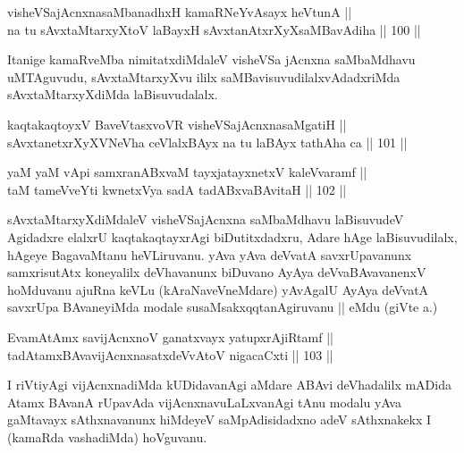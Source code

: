 \begin{shl}
visheVSajAcnxnasaMbanadhxH kamaRNeYvAsayx heVtunA || \\
na tu sAvxtaMtarxyXtoV laBayxH sAvxtanAtxrXyXsaMBavAdiha \hfill || 100 ||  
\end{shl}

\begin{artha}
Itanige kamaRveMba nimitatxdiMdaleV visheVSa jAcnxna saMbaMdhavu
uMTAguvudu, sAvxtaMtarxyXvu ililx saMBavisuvudilalxvAdadxriMda
sAvxtaMtarxyXdiMda laBisuvudalalx.
\end{artha}


\begin{shl}
kaqtakaqtoyxV BaveVtasxvoVR visheVSajAcnxnasaMgatiH || \\
sAvxtanetxrXyXVNeVha ceVlalxBAyx na tu laBAyx tathA\s \s ha ca \hfill || 101 || 
\end{shl}

\begin{shl}
yaM yaM vA\s pi samxranABxvaM tayxjatayxnetxV kaleVvaramf ||  \\
taM tameVveYti kwnetxVya sadA tadABxvaBAvitaH \hfill || 102 ||  
\end{shl}

\begin{artha}
sAvxtaMtarxyXdiMdaleV visheVSajAcnxna saMbaMdhavu laBisuvudeV
Agidadxre elalxrU kaqtakaqtayxrAgi biDutitxdadxru, Adare hAge
laBisuvudilalx, hAgeye BagavaMtanu heVLiruvanu. yAva yAva deVvatA
savxrUpavanunx samxrisutAtx koneyalilx deVhavanunx biDuvano AyAya
deVvaBAvavanenxV hoMduvanu ajuRna keVLu (kAraNaveVneMdare) yAvAgalU
AyAya deVvatA savxrUpa BAvaneyiMda modale susaMsakxqqtanAgiruvanu ||
eMdu (giVte  a.\quad) 
\end{artha}


\begin{shl}
EvamAtAmx savijAcnxnoV ganatxvayx yatupxrA\s jiRtamf || \\
tadAtamxBAvavijAcnxnasatxdeVvAtoV nigacaCxti \hfill || 103 ||  
\end{shl}

\begin{artha}
I riVtiyAgi vijAcnxnadiMda kUDidavanAgi aMdare ABAvi deVhadalilx
mADida Atamx BAvanA rUpavAda vijAcnxnavuLaLxvanAgi tAnu modalu yAva
gaMtavayx sAthxnavanunx hiMdeyeV saMpAdisidadxno adeV sAthxnakekx I
(kamaRda vashadiMda) hoVguvanu.
\end{artha}

